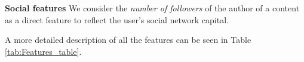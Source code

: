 	\noindent\textbf{Social  features} We consider the \emph{number of followers} of  the author of a content as a direct feature to reflect the user's social network capital. 

A more detailed description of all the features can be seen in  Table \ref{tab:Features_table}.

%
%
